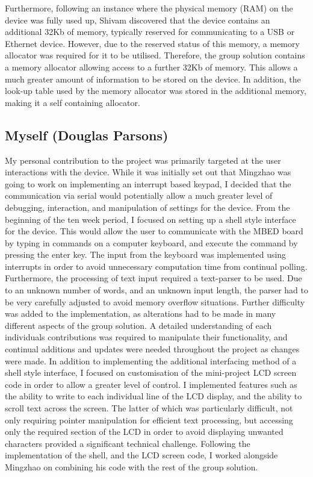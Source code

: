 Furthermore, following an 
instance where the physical memory (RAM) on the device was fully used up, Shivam 
discovered that the device contains an additional 32Kb of memory, 
typically reserved for communicating to a USB or Ethernet device. However, 
due to the reserved status of this memory, a memory allocator was required for 
it to be utilised. 
Therefore, the group solution contains a memory allocator allowing access to 
a further 32Kb of memory. This allows a much greater amount of information to be 
stored on the device. 
In addition, the look-up table used by the memory allocator was stored in the 
additional memory, making it a self containing allocator. 

\subsection*{Myself (Douglas Parsons)}

My personal contribution to the project was primarily targeted at the user 
interactions with the device. While it was initially set out that Mingzhao was 
going to work on implementing an interrupt based keypad, I decided that the 
communication via serial would potentially allow a much greater level of 
debugging, interaction, and manipulation of settings for the device. From the 
beginning of the ten week period, I focused on setting up a shell style interface 
for the device. This would allow the user to communicate with the MBED board by 
typing in commands on a computer keyboard, and execute the command by pressing 
the enter key. The input from the keyboard was implemented using interrupts in 
order to avoid unnecessary computation time from continual polling. 
Furthermore, the processing of text input required a text-parser to be used. 
Due to an unknown number of words, and an unknown input length, the parser had 
to be very carefully adjusted to avoid memory overflow situations. Further 
difficulty was added to the implementation, as alterations had to be made in many 
different aspects of the group solution. A detailed understanding of each 
individuals contributions was required to manipulate their functionality, and 
continual additions and updates were needed throughout the project as changes 
were made. 
In addition to implementing the additional interfacing method of a shell style 
interface, I focused on customisation of the mini-project LCD screen code in 
order to allow a greater level of control. I implemented features such as the 
ability to write to each individual line of the LCD display, and the ability to 
scroll text across the screen. 
The latter of which was particularly difficult, not only requiring pointer 
manipulation for efficient text processing, but accessing only the required 
section of the LCD in order to avoid displaying unwanted characters provided 
a significant technical challenge. Following the implementation of the shell, and 
the LCD screen code, 
I worked alongside Mingzhao on combining his code with 
the rest of the group solution. 

